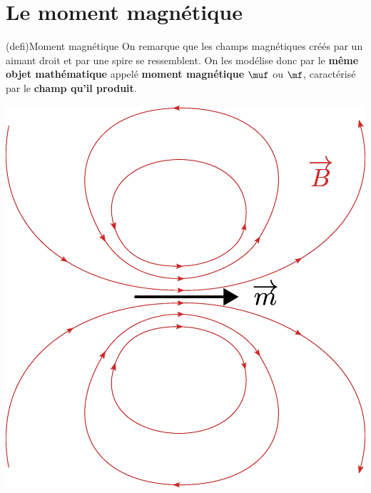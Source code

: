 \documentclass[../../main/main.tex]{subfiles}
\begin{document}
\section{Le moment magnétique}
\label{sec:momag}
\begin{tcb*}[sidebyside, righthand ratio=.2](defi){Moment magnétique}
  On remarque que les champs magnétiques créés par un aimant droit et par une
  spire se ressemblent. On les modélise donc par le \textbf{même objet
  mathématique} appelé \textbf{moment magnétique} $\muf$ ou $\mf$, caractérisé
  par le \textbf{champ qu'il produit}.
  \tcblower
  \begin{center}
    \includegraphics[width=\linewidth]{momag_gen}
  \end{center}
\end{tcb*}
\end{document}
